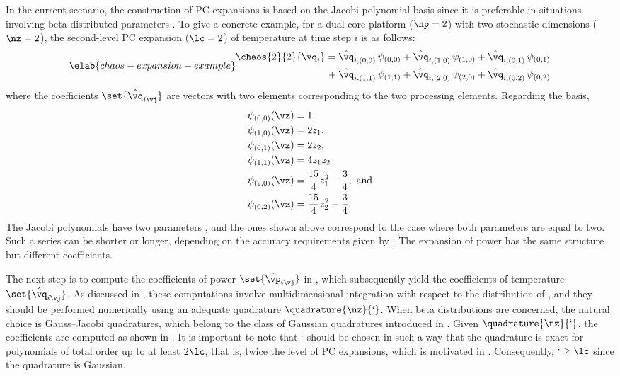 In the current scenario, the construction of \ac{PC} expansions is based on the
Jacobi polynomial basis since it is preferable in situations involving
beta-distributed parameters \cite{xiu2010}. To give a concrete example, for a
dual-core platform ($\np = 2$) with two stochastic dimensions ($\nz = 2$), the
second-level \ac{PC} expansion ($\lc = 2$) of temperature at time step $i$ is as
follows:
\begin{equation} \elab{chaos-expansion-example}
  \begin{split}
    \chaos{2}{2}{\vq_i}
    =    {} & \hat{\vq}_{i, (0, 0)} \, \psi_{(0, 0)} +
              \hat{\vq}_{i, (1, 0)} \, \psi_{(1, 0)} +
              \hat{\vq}_{i, (0, 1)} \, \psi_{(0, 1)} \\
    {} + {} & \hat{\vq}_{i, (1, 1)} \, \psi_{(1, 1)} +
              \hat{\vq}_{i, (2, 0)} \, \psi_{(2, 0)} +
              \hat{\vq}_{i, (0, 2)} \, \psi_{(0, 2)}
  \end{split}
\end{equation}
where the coefficients $\set{\hat{\vq}_{i \vj}}$ are vectors with two elements
corresponding to the two processing elements. Regarding the basis,
\begin{align*}
  & \psi_{(0, 0)}(\vz) = 1, \\
  & \psi_{(1, 0)}(\vz) = 2 z_1, \\
  & \psi_{(0, 1)}(\vz) = 2 z_2, \\
  & \psi_{(1, 1)}(\vz) = 4 z_1 z_2 \\
  & \psi_{(2, 0)}(\vz) = \frac{15}{4} z_1^2 - \frac{3}{4}, \text{ and} \\
  & \psi_{(0, 2)}(\vz) = \frac{15}{4} z_2^2 - \frac{3}{4}.
\end{align*}
The Jacobi polynomials have two parameters \cite{xiu2010}, and the ones shown
above correspond to the case where both parameters are equal to two. Such a
series can be shorter or longer, depending on the accuracy requirements given by
\lc. The expansion of power has the same structure but different coefficients.

The next step is to compute the coefficients of power $\set{\hat{\vp}_{i \vj}}$
in , which subsequently yield the coefficients of
temperature $\set{\hat{\vq}_{i \vj}}$. As discussed in
, these computations involve multidimensional
integration with respect to the distribution of \vz, and they should be
performed numerically using an adequate quadrature $\quadrature{\nz}{\lq}$. When
beta distributions are concerned, the natural choice is Gauss--Jacobi
quadratures, which belong to the class of Gaussian quadratures introduced in
. Given $\quadrature{\nz}{\lq}$, the coefficients are
computed as shown in . It is important to note that \lq
should be chosen in such a way that the quadrature is exact for polynomials of
total order up to at least $2 \lc$, that is, twice the level of \ac{PC}
expansions, which is motivated in . Consequently, $\lq
\geq \lc$ since the quadrature is Gaussian.

